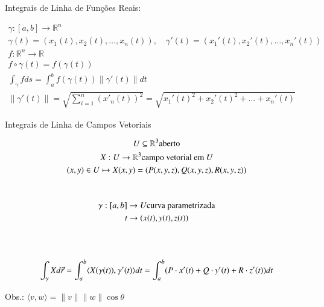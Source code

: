 	\begin{large}
	Integrais de Linha de Funções Reais:
	\end{large}
	\begin{gather*}
	\gamma:[a,b]\to\mathbb{R}^n \\
	\gamma(t)=(x_1(t),x_2(t),\ldots,x_n(t)), \hspace{12pt} \gamma'(t)=(x_1'(t),x_2'(t),\ldots,x_n'(t))\\
	f:\mathbb{R}^n\to\mathbb{R} \\
	f\circ \gamma (t) = f(\gamma (t))\\
	\displaystyle\int_\gamma f ds = \displaystyle\int_a^b f(\gamma (t))\|\gamma '(t)\| dt\\
	\|\gamma'(t)\|=\sqrt{\displaystyle\sum_{i=1}^n(x'_n(t))^2} = \sqrt{x_1'(t)^2+x_2'(t)^2+\ldots+x_n'(t)}
	\end{gather*}
	
	\begin{large}
	Integrais de Linha de Campos Vetoriais	
	\end{large}		
	\begin{gather*}
	U\subseteq\mathbb{R}^3 \text{aberto} \\
	X:U\to \mathbb{R}^3 \text{campo vetorial em $U$} \\
	(x,y)\in U \mapsto X(x,y)= (P(x,y,z),Q(x,y,z),R(x,y,z))\\
	\vspace{12pt}\\
	\gamma:[a,b] \to U \text{curva parametrizada}\\
	t \to (x(t),y(t),z(t)) \\
	\vspace{24pt}\\
	\displaystyle\int_\gamma Xd\vec{r}=\displaystyle\int_a^b\langle X(\gamma(t)), \gamma'(t) \rangle dt = \displaystyle\int_a^b(P\cdot x'(t) + Q\cdot y'(t) + R\cdot z'(t)) dt
	\end{gather*}
	
	\null\hspace{48pt}Obs.: $\langle v,w \rangle = \|v\|\|w\|\cos\theta$
	
